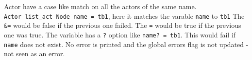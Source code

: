Actor have a case like match on all the actors of the same name.
\texttt{Actor\ list\_act\ Node\ name\ =\ tb1}, here it matches the
varable \texttt{name} to \texttt{tb1} The \texttt{\&=} would be false if
the previous one failed. The \texttt{\textbar{}=} would be true if the
previous one was true. The variable has a \texttt{?} option like
\texttt{name?\ =\ tb1}. This would fail if \texttt{name} does not exist.
No error is printed and the global errors flag is not updated - not seen
as an error.

